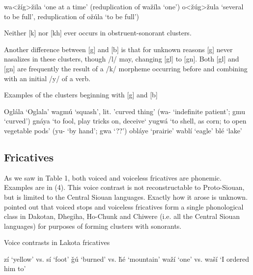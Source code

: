 \documentclass[output=paper]{LSP/langsci}
\begin{document}
\begin{exe}
\ex \begin{xlist}
\ex wa<\v{z}\'ig>\v{z}ila `one at a time' (reduplication of wa\v{z}\'ila `one')
\ex o<\v{z}\'ug>\v{z}ula `several to be full', reduplication of o\v{z}\'ula `to be full')
\end{xlist}
\end{exe}

Neither [k] nor [kh] ever occurs in obstruent-sonorant clusters. 

Another difference between [g] and [b] is that for unknown reasons [g] never nasalizes in these clusters, though /l/ may, changing [gl] to [gn]. Both [gl] and [gn] are frequently the result of a /k/ morpheme occurring before and combining with an initial /y/ of a verb.

\begin{exe}
\ex Examples of the clusters beginning with [g] and [b]
\begin{xlist}
\ex Ogl\'ala `Oglala'
\ex wagm\'u `squash', lit. 'curved thing' (wa- `indefinite patient'; gmu `curved')
\ex gn\'aya `to fool, play tricks on, deceive`
\ex yugw\'a `to shell, as corn; to open vegetable pods' (yu- `by hand'; gwa `??')
\ex obl\'aye `prairie'
\ex wabl\'i `eagle'
\ex bl\'e `lake'
\end{xlist}
\end{exe}

\subsection{Fricatives}

As we saw in Table 1, both voiced and voiceless fricatives are phonemic. Examples are in (4). This voice contrast is not reconstructable to Proto-Siouan, but is limited to the Central Siouan languages. Exactly how it arose is unknown. \citet{Miner1979} pointed out that voiced stops and voiceless fricatives form a single phonological class in Dakotan, Dhegiha, Ho-Chunk and Chiwere (i.e. all the Central Siouan languages) for purposes of forming clusters with sonorants.

\begin{exe}
\ex Voice contrasts in Lakota fricatives
\begin{xlist}
\ex z\'i `yellow' vs. s\'i `foot'
\ex \v{g}\'u `burned' vs. \v{h}\'e `mountain'
\ex wa\v{z}\'i `one' vs. wa\v{s}\'i `I ordered him to'
\end{xlist}
\end{exe}
\end{document}
